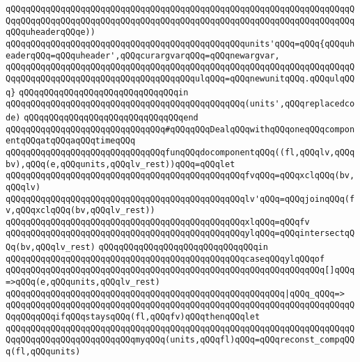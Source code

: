 \verb|qQQqqQQqqQQqqQQqqQQqqQQqqQQqqQQqqQQqqQQqqQQqqQQqqQQqqQQqqQQqqQQqqQQqqQQqqQQqqQQqqQQqqQQqqQQqqQQqqQQqqQQqqQQqqQQqqQQqqQQqqQQqqQQqqQQqqQQqqQQqqQQquheaderqQQqe))|\newline
\verb|qQQqqQQqqQQqqQQqqQQqqQQqqQQqqQQqqQQqqQQqqQQqqQQqunits'qQQq=qQQq{qQQquheaderqQQq=qQQquheader',qQQqcurargvarqQQq=qQQqnewargvar,|\newline
\verb|qQQqqQQqqQQqqQQqqQQqqQQqqQQqqQQqqQQqqQQqqQQqqQQqqQQqqQQqqQQqqQQqqQQqqQQqqQQqqQQqqQQqqQQqqQQqqQQqqQQqqQQqqQQqulqQQq=qQQqnewunitqQQq.qQQqulqQQq}|\newline
\verb|qQQqqQQqqQQqqQQqqQQqqQQqqQQqqQQqin|\newline
\verb|qQQqqQQqqQQqqQQqqQQqqQQqqQQqqQQqqQQqqQQqqQQqqQQq(units',qQQqreplacedcode)|\newline
\verb|qQQqqQQqqQQqqQQqqQQqqQQqqQQqqQQqend|\newline
\newline
\verb|qQQqqQQqqQQqqQQqqQQqqQQqqQQqqQQq#qQQqqQQqDealqQQqwithqQQqoneqQQqcomponentqQQqatqQQqaqQQqtimeqQQq|\newline
\verb|qQQqqQQqqQQqqQQqqQQqqQQqqQQqqQQqfunqQQqdocomponentqQQq((fl,qQQqlv,qQQqbv),qQQq(e,qQQqunits,qQQqlv_rest))qQQq=qQQqlet|\newline
\verb|qQQqqQQqqQQqqQQqqQQqqQQqqQQqqQQqqQQqqQQqqQQqqQQqfvqQQq=qQQqxclqQQq(bv,qQQqlv)|\newline
\verb|qQQqqQQqqQQqqQQqqQQqqQQqqQQqqQQqqQQqqQQqqQQqqQQqlv'qQQq=qQQqjoinqQQq(fv,qQQqxclqQQq(bv,qQQqlv_rest))|\newline
\verb|qQQqqQQqqQQqqQQqqQQqqQQqqQQqqQQqqQQqqQQqqQQqqQQqxlqQQq=qQQqfv|\newline
\verb|qQQqqQQqqQQqqQQqqQQqqQQqqQQqqQQqqQQqqQQqqQQqqQQqylqQQq=qQQqintersectqQQq(bv,qQQqlv_rest)|\newline
\verb|qQQqqQQqqQQqqQQqqQQqqQQqqQQqqQQqin|\newline
\verb|qQQqqQQqqQQqqQQqqQQqqQQqqQQqqQQqqQQqqQQqqQQqqQQqcaseqQQqylqQQqof|\newline
\verb|qQQqqQQqqQQqqQQqqQQqqQQqqQQqqQQqqQQqqQQqqQQqqQQqqQQqqQQqqQQqqQQq[]qQQq=>qQQq(e,qQQqunits,qQQqlv_rest)|\newline
\verb|qQQqqQQqqQQqqQQqqQQqqQQqqQQqqQQqqQQqqQQqqQQqqQQqqQQqqQQq|\verb#|qQQq_qQQq=>#\newline
\verb|qQQqqQQqqQQqqQQqqQQqqQQqqQQqqQQqqQQqqQQqqQQqqQQqqQQqqQQqqQQqqQQqqQQqqQQqqQQqqQQqifqQQqstaysqQQq(fl,qQQqfv)qQQqthenqQQqlet|\newline
\verb|qQQqqQQqqQQqqQQqqQQqqQQqqQQqqQQqqQQqqQQqqQQqqQQqqQQqqQQqqQQqqQQqqQQqqQQqqQQqqQQqqQQqqQQqqQQqqQQqmyqQQq(units,qQQqfl)qQQq=qQQqreconst_compqQQq(fl,qQQqunits)|\newline
